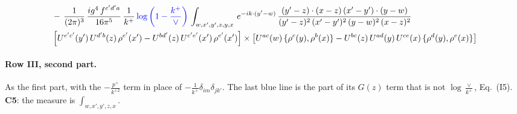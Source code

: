 \documentclass[10pt]{article}
\numberwithin{equation}{section}
\newcommand{\new}[1]{{\color{blue}#1}}
\begin{document}
\begin{align}
& -\,\frac{1}{(2\pi)^{3}}\, \frac{ig^{4}\,f^{c'd'a}}{16\pi^{5}}\, \frac{1}{k^{+}}\,\new{\log{\left(1-\frac{k^{+}}{\vee}\right)}}\, \int_{w,x',y',z,y,x}\, e^{-ik\cdot (y'-w)}\,\frac{(y'-z)\cdot (x-z)\,(x'-y')\cdot (y-w)}{(y'-z)^{2}\,(x'-y')^{2}\,(y-w)^{2}\,(x-z)^{2}}\notag \\ &  \left[U^{e'c'}(y')\,U^{d'b}(z)\,\rho^{e'}(x')-U^{bd'}(z)\,U^{c'e'}(x')\,\rho^{e'}(x')\right]\times  \left[U^{ac}(w)\, \{\rho^{c}(y),\rho^{b}(x)\}-U^{bc}(z)\,U^{ad}(y)\,U^{ce}(x)\,\{\rho^{d}(y),\rho^{e}(x)\}\right] \label{eq:F:G3III1}
\end{align}

\paragraph{Row III, second part.}
As the first part, with the $-\frac{p^+}{k^{+2}}$ term in place of $-\frac{1}{k^+}\delta_{im}\delta_{jk'}$. The last \new{blue} line is the part of its $G(z)$ term that is not $\log\frac{\vee}{k^+}$, Eq.~(I5). \textbf{C5}: the measure is $\int_{w,x',y',z,x}$.
\end{document}
